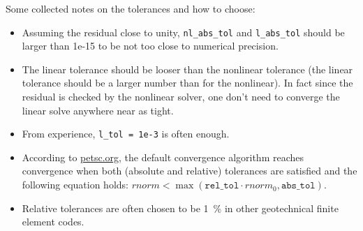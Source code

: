 Some collected notes on the tolerances and how to choose:

\begin{itemize}
  \item Assuming the residual close to unity, \texttt{nl\_abs\_tol} and
        \texttt{l\_abs\_tol} should be larger than 1e-15 to be not too close to
        numerical precision.
  \item The linear tolerance should be looser than the nonlinear tolerance (the linear
        tolerance should be a larger number than for the nonlinear). In fact since the
        residual is checked by the nonlinear solver, one don't need to converge the
        linear solve anywhere near as tight.
  \item From experience, \texttt{l\_tol = 1e-3} is often enough.
  \item According to
        \href{https://petsc.org/release/manualpages/KSP/KSPConvergedDefault/}{petsc.org},
        the default convergence algorithm reaches convergence when both (absolute and
        relative) tolerances are satisfied and the following equation holds: \newline
        $rnorm < \max (\texttt{rel\_tol} \cdot rnorm_0, \texttt{abs\_tol})$.
  \item Relative tolerances are often chosen to be \SI{1}{\percent} in other
        geotechnical finite element codes.
\end{itemize}






%
